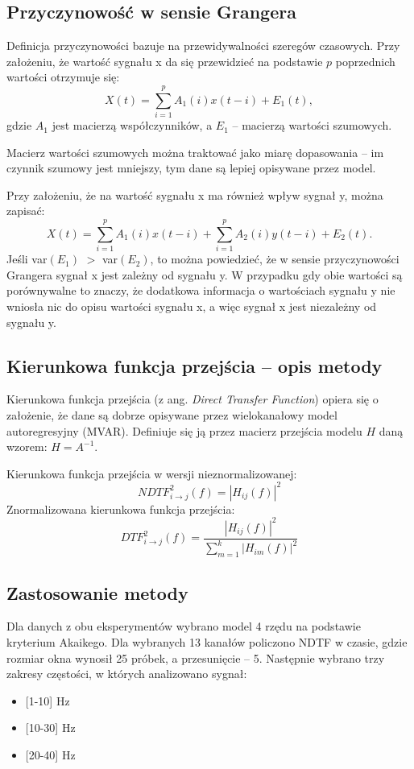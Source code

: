 \documentclass{pracamgr}
\begin{document}
	\subsection{Przyczynowość w sensie Grangera}
	Definicja przyczynowości bazuje na przewidywalności szeregów czasowych. Przy założeniu, że wartość sygnału x da się przewidzieć na podstawie $p$ poprzednich wartości otrzymuje się:
	\begin{equation}
		X(t) = \sum_{i=1}^{p}A_1(i)x(t-i)+E_1(t),
	\end{equation}
	gdzie $A_1$ jest macierzą współczynników, a $E_1$ -- macierzą wartości szumowych.
	
	Macierz wartości szumowych można traktować jako miarę dopasowania -- im czynnik szumowy jest mniejszy, tym dane są lepiej opisywane przez model.
	
	Przy założeniu, że na wartość sygnału x ma również wpływ sygnał y, można zapisać:
	\begin{equation}
		X(t) = \sum_{i=1}^{p}A_1(i)x(t-i)+\sum_{i=1}^{p}A_2(i)y(t-i)+E_2(t).
	\end{equation}
	Jeśli var$(E_1)$ $>$ var$(E_2)$, to można powiedzieć, że w sensie przyczynowości Grangera sygnał x jest zależny od sygnału y. W przypadku gdy obie wartości są porównywalne to znaczy, że dodatkowa informacja o wartościach sygnału y nie wniosła nic do opisu wartości sygnału x, a więc sygnał x jest niezależny od sygnału y.
	\subsection{Kierunkowa funkcja przejścia -- opis metody}
	Kierunkowa funkcja przejścia (z ang. \textit{Direct Transfer Function}) opiera się o założenie, że dane są dobrze opisywane przez wielokanałowy model autoregresyjny (MVAR). Definiuje się ją przez macierz przejścia modelu $H$ daną wzorem: $H = A^{-1}$.
	
	Kierunkowa funkcja przejścia w wersji nieznormalizowanej:
	\begin{equation}
		{NDTF}_{i\to j}^2 (f) = {\left|H_{ij}(f) \right|}^2
	\end{equation}
	Znormalizowana kierunkowa funkcja przejścia:
	\begin{equation}
		{DTF}_{i\to j}^2 (f) = \frac{{\left|H_{ij}(f) \right|}^2}{\sum_{m=1}^{k}{\left|H_{im}(f) \right|}^2 }
	\end{equation}
	\subsection{Zastosowanie metody}
	Dla danych z obu eksperymentów wybrano model 4 rzędu na podstawie kryterium Akaikego. Dla wybranych 13 kanałów policzono NDTF w czasie, gdzie rozmiar okna wynosił 25 próbek, a przesunięcie -- 5. Następnie wybrano trzy zakresy częstości, w których analizowano sygnał: 
	\begin{itemize}
		\item {[1-10]} Hz
		\item {[10-30]} Hz
		\item {[20-40]} Hz
	\end{itemize}
\end{document}

